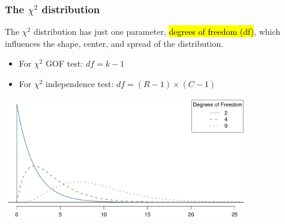 \documentclass[11pt,containsverbatim,handout,xcolor=xelatex,dvipsnames,table]{beamer}
\begin{document}
\begin{frame}
\frametitle{The $\chi^2$ distribution}

The $\chi^2$ distribution has just one parameter, \hl{degrees of freedom (df)}, which influences the shape, center, and spread of the distribution.
\begin{itemize}
\item For $\chi^2$ GOF test: $df = k - 1$ \\
\item For $\chi^2$ independence test: $df = (R-1) \times (C-1)$ 
\end{itemize}

\pause

\begin{center}
\includegraphics[width=0.8\textwidth]{figures/chiSquareDistributionWithInceasingDF/chiSquareDistributionWithInceasingDF}
\end{center}

\end{frame}

\end{document}
